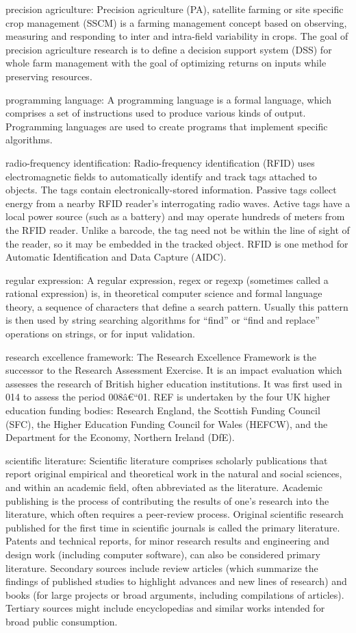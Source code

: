 \documentclass[]{book}
\newcommand{\euro}{€}
\begin{document}
precision agriculture: Precision agriculture (PA), satellite farming or
site specific crop management (SSCM) is a farming management concept
based on observing, measuring and responding to inter and intra-field
variability in crops. The goal of precision agriculture research is to
define a decision support system (DSS) for whole farm management with
the goal of optimizing returns on inputs while preserving resources.

programming language: A programming language is a formal language, which
comprises a set of instructions used to produce various kinds of output.
Programming languages are used to create programs that implement
specific algorithms.

radio-frequency identification: Radio-frequency identification (RFID)
uses electromagnetic fields to automatically identify and track tags
attached to objects. The tags contain electronically-stored information.
Passive tags collect energy from a nearby RFID reader's interrogating
radio waves. Active tags have a local power source (such as a battery)
and may operate hundreds of meters from the RFID reader. Unlike a
barcode, the tag need not be within the line of sight of the reader, so
it may be embedded in the tracked object. RFID is one method for
Automatic Identification and Data Capture (AIDC).

regular expression: A regular expression, regex or regexp (sometimes
called a rational expression) is, in theoretical computer science and
formal language theory, a sequence of characters that define a search
pattern. Usually this pattern is then used by string searching
algorithms for ``find'' or ``find and replace'' operations on strings,
or for input validation.

research excellence framework: The Research Excellence Framework is the
successor to the Research Assessment Exercise. It is an impact
evaluation which assesses the research of British higher education
institutions. It was first used in 014 to assess the period
008â\euro{}``01. REF is undertaken by the four UK higher education
funding bodies: Research England, the Scottish Funding Council (SFC),
the Higher Education Funding Council for Wales (HEFCW), and the
Department for the Economy, Northern Ireland (DfE).

scientific literature: Scientific literature comprises scholarly
publications that report original empirical and theoretical work in the
natural and social sciences, and within an academic field, often
abbreviated as the literature. Academic publishing is the process of
contributing the results of one's research into the literature, which
often requires a peer-review process. Original scientific research
published for the first time in scientific journals is called the
primary literature. Patents and technical reports, for minor research
results and engineering and design work (including computer software),
can also be considered primary literature. Secondary sources include
review articles (which summarize the findings of published studies to
highlight advances and new lines of research) and books (for large
projects or broad arguments, including compilations of articles).
Tertiary sources might include encyclopedias and similar works intended
for broad public consumption.
\end{document}
